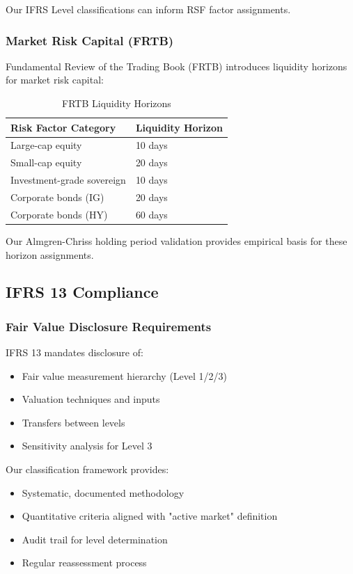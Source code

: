 \documentclass[11pt,a4paper]{article}
\begin{document}
Our IFRS Level classifications can inform RSF factor assignments.

\subsubsection{Market Risk Capital (FRTB)}

Fundamental Review of the Trading Book (FRTB) introduces liquidity horizons for market risk capital:

\begin{table}[h]
\centering
\caption{FRTB Liquidity Horizons}
\begin{tabular}{@{}ll@{}}
\toprule
Risk Factor Category & Liquidity Horizon \\
\midrule
Large-cap equity & 10 days \\
Small-cap equity & 20 days \\
Investment-grade sovereign & 10 days \\
Corporate bonds (IG) & 20 days \\
Corporate bonds (HY) & 60 days \\
\bottomrule
\end{tabular}
\end{table}

Our Almgren-Chriss holding period validation provides empirical basis for these horizon assignments.

\subsection{IFRS 13 Compliance}

\subsubsection{Fair Value Disclosure Requirements}

IFRS 13 mandates disclosure of:
\begin{itemize}
    \item Fair value measurement hierarchy (Level 1/2/3)
    \item Valuation techniques and inputs
    \item Transfers between levels
    \item Sensitivity analysis for Level 3
\end{itemize}

Our classification framework provides:
\begin{itemize}
    \item[\checkmark] Systematic, documented methodology
    \item[\checkmark] Quantitative criteria aligned with "active market" definition
    \item[\checkmark] Audit trail for level determination
    \item[\checkmark] Regular reassessment process
\end{itemize}
\end{document}
